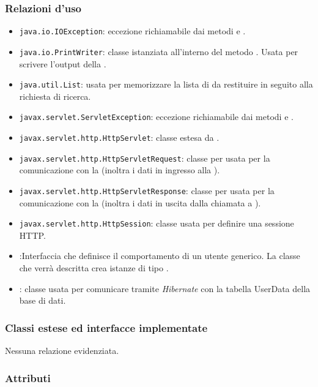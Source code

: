 \subsubsection*{Relazioni d'uso}

\begin{itemize}
	\item \texttt{java.io.IOException}: eccezione richiamabile dai metodi  e .
	\item \texttt{java.io.PrintWriter}: classe istanziata all'interno del metodo . Usata per scrivere l'output della .
	\item \texttt{java.util.List}: usata per memorizzare la lista di  da restituire in seguito alla richiesta di ricerca.
	\item \texttt{javax.servlet.ServletException}: eccezione richiamabile dai metodi  e .
	\item \texttt{javax.servlet.http.HttpServlet}: classe estesa da .
	\item \texttt{javax.servlet.http.HttpServletRequest}:  classe per usata per la comunicazione con la  (inoltra i dati in ingresso alla ).
	\item \texttt{javax.servlet.http.HttpServletResponse}: classe per usata per la comunicazione con la  (inoltra i dati in uscita dalla chiamata a ).
	\item \texttt{javax.servlet.http.HttpSession}: classe usata per definire una sessione HTTP.
	\item {}:Interfaccia che definisce il comportamento di un utente generico. La classe che verrà descritta crea istanze di tipo .
	\item {}: classe usata per comunicare tramite \textit{Hibernate} con la tabella UserData della base di dati.
\end{itemize}

\subsubsection*{Classi estese ed interfacce implementate}

Nessuna relazione evidenziata.

\subsubsection*{Attributi}

